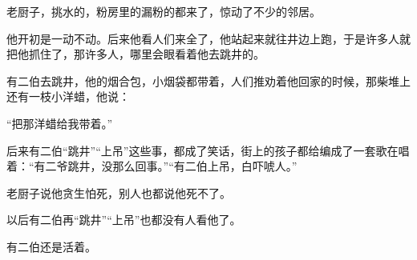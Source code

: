 \par 老厨子，挑水的，粉房里的漏粉的都来了，惊动了不少的邻居。
\par 他开初是一动不动。后来他看人们来全了，他站起来就往井边上跑，于是许多人就把他抓住了，那许多人，哪里会眼看着他去跳井的。
\par 有二伯去跳井，他的烟合包，小烟袋都带着，人们推劝着他回家的时候，那柴堆上还有一枝小洋蜡，他说：
\par “把那洋蜡给我带着。”
\par 后来有二伯“跳井”“上吊”这些事，都成了笑话，街上的孩子都给编成了一套歌在唱着：“有二爷跳井，没那么回事。”“有二伯上吊，白吓唬人。”
\par 老厨子说他贪生怕死，别人也都说他死不了。
\par 以后有二伯再“跳井”“上吊”也都没有人看他了。
\par 有二伯还是活着。
